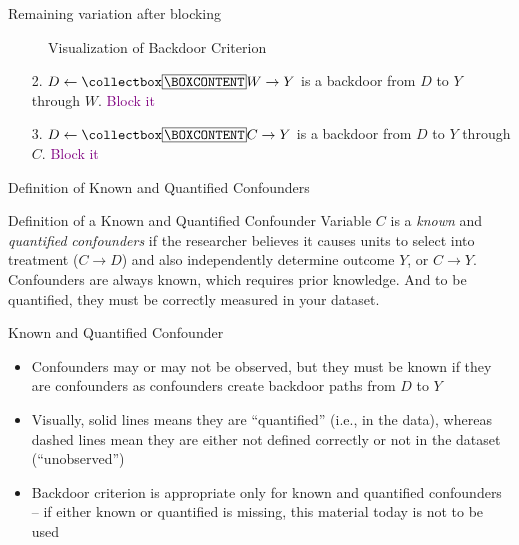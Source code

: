 \documentclass{beamer}
\begin{document}
\begin{frame}{Remaining variation after blocking}

\begin{figure}
\begin{center}
\caption{Visualization of Backdoor Criterion}
\end{center}
\end{figure}

\bigskip

\begin{enumerate}
\item[2. ] $D\leftarrow \mybox{W} \rightarrow Y$ is a backdoor from $D$ to $Y$ through $W$. \textcolor{purple}{Block it}
\item[3. ] $D\leftarrow \mybox{C} \rightarrow Y$ is a backdoor from $D$ to $Y$ through $C$. \textcolor{purple}{Block it}
\end{enumerate}
\end{frame}


\begin{frame}{Definition of Known and Quantified Confounders}
	
	
	\begin{block}{Definition of a Known and Quantified Confounder}
	Variable $C$ is a \emph{known} and \emph{quantified} \emph{confounders} if the researcher believes it causes units to select into treatment ($C \rightarrow D$) and also independently determine outcome $Y$, or $C \rightarrow Y$. Confounders are always known, which requires prior knowledge. And to be quantified, they must be correctly measured in your dataset.
	\end{block}
	
	
\end{frame}

\begin{frame}{Known and Quantified Confounder}

	\begin{itemize}
	\item Confounders may or may not be observed, but they must be known if they are confounders as confounders create backdoor paths from $D$ to $Y$
	\item Visually, solid lines means they are ``quantified'' (i.e., in the data), whereas dashed lines mean they are either not defined correctly or not in the dataset (``unobserved'')
	\item Backdoor criterion is appropriate only for known and quantified confounders -- if either known or quantified is missing, this material today is not to be used
	\end{itemize}

\end{frame}
\end{document}
